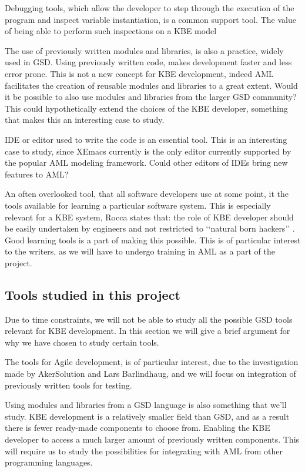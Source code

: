 Debugging tools, which allow the developer to step through the execution of the program and inspect variable instantiation, is a common support tool. The value of being able to perform such inspections on a KBE model

The use of previously written modules and libraries, is also a practice, widely used in GSD. Using previously written code, makes development faster and less error prone. This is not a new concept for KBE development, indeed AML facilitates the creation of reusable modules and libraries to a great extent. Would it be possible to also use modules and libraries from the larger GSD community? This could hypothetically extend the choices of the KBE developer, something that makes this an interesting case to study.

IDE or editor used to write the code is an essential tool. This is an interesting case to study, since XEmacs currently is the only editor currently supported by the popular AML modeling framework. Could other editors of IDEs bring new features to AML?

An often overlooked tool, that all software developers use at some point, it the tools available for learning a particular software system. This is especially relevant for a KBE system, Rocca states that: the role of KBE developer should be easily undertaken by engineers and not restricted to ‘‘natural born hackers’’ \cite{rocca}. Good learning tools is a part of making this possible. This is of particular interest to the writers, as we will have to undergo training in AML as a part of the project.

\subsection{Tools studied in this project} %
\label{sub:tools_studied_in_this_project}
Due to time constraints, we will not be able to study all the possible GSD tools relevant for KBE development. In this section we will give a brief argument for why we have chosen to study certain tools.

The tools for Agile development, is of particular interest, due to the investigation made by AkerSolution and Lars Barlindhaug, and we will focus on integration of previously written tools for testing.

Using modules and libraries from a GSD language is also something that we'll study. KBE development is a relatively smaller field than GSD, and as a result there is fewer ready-made components to choose from. Enabling the KBE developer to access a much larger amount of previously written components. This will require us to study the possibilities for integrating with AML from other programming languages.

